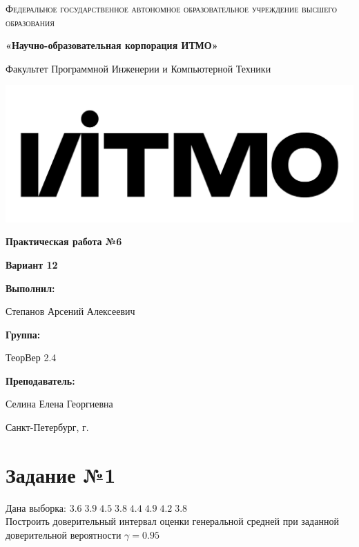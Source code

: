 \documentclass[12pt,a4paper]{report}
\begin{document}
\begin{titlepage} 
	\centering
	{
        \scshape
        Федеральное государственное автономное образовательное учреждение высшего образования
        \par
        \textbf{«Научно-образовательная корпорация ИТМО»}
        \par
        \vspace*{1cm}
        Факультет Программной Инженерии и Компьютерной Техники
        \par
    }
    \vspace*{0.6cm}
    \includegraphics[width=\textwidth]{logo.png}
    {
        \Large
        \textbf{Практическая работа №6}
        \par
        \normalsize
        \vspace*{0.75cm}
        \textbf{Вариант 12}
        \par
    }
    \vfill
    \hfill\begin{minipage}{\dimexpr\textwidth-7.8cm}
        \textbf{Выполнил:}\par
        Степанов Арсений Алексеевич\par
        \vspace*{0.15cm}
        \textbf{Группа:}\par
        ТеорВер 2.4\par
        \vspace*{0.15cm}
        \textbf{Преподаватель:}\par
        Селина Елена Георгиевна\par
    \end{minipage}
    \vfill
    Санкт-Петербург, \the\year{}г.
\end{titlepage}  
\section*{Задание №1}
Дана выборка: $3.6\;3.9\;4.5\;3.8\;4.4\;4.9\;4.2\;3.8$ \\
\hfill\break
Построить доверительный интервал оценки генеральной средней при заданной доверительной вероятности $\gamma = 0.95$
\end{document}
